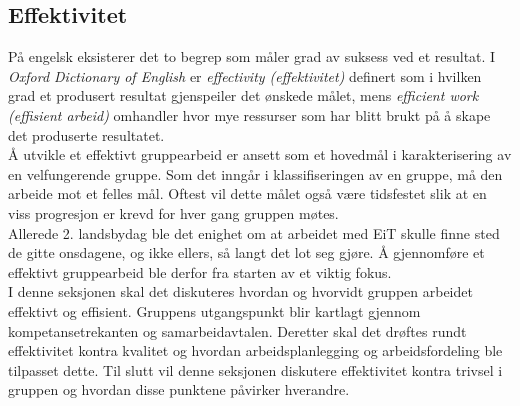\subsection{Effektivitet}
På engelsk eksisterer det to begrep som måler grad av suksess ved et resultat. 
I \textit{Oxford Dictionary of English} er \textit{effectivity (effektivitet)} definert som i hvilken grad et produsert resultat gjenspeiler det ønskede målet, mens \textit{efficient work (effisient arbeid)} omhandler hvor mye ressurser som har blitt brukt på å skape det produserte resultatet.
\\
Å utvikle et effektivt gruppearbeid er ansett som et hovedmål i karakterisering av en velfungerende gruppe. 
Som det inngår i klassifiseringen av en gruppe, må den arbeide mot et felles mål. 
Oftest vil dette målet også være tidsfestet slik at en viss progresjon er krevd for hver gang gruppen møtes.
\\
Allerede 2. landsbydag ble det enighet om at arbeidet med EiT skulle finne sted de gitte onsdagene, og ikke ellers, så langt det lot seg gjøre. 
Å gjennomføre et effektivt gruppearbeid ble derfor fra starten av et viktig fokus. 
\\
I denne seksjonen skal det diskuteres hvordan og hvorvidt gruppen arbeidet effektivt og effisient.
Gruppens utgangspunkt blir kartlagt gjennom kompetansetrekanten og samarbeidavtalen.
Deretter skal det drøftes rundt effektivitet kontra kvalitet og hvordan arbeidsplanlegging og arbeidsfordeling ble tilpasset dette.
Til slutt vil denne seksjonen diskutere effektivitet kontra trivsel i gruppen og hvordan disse punktene påvirker hverandre. 
\\

